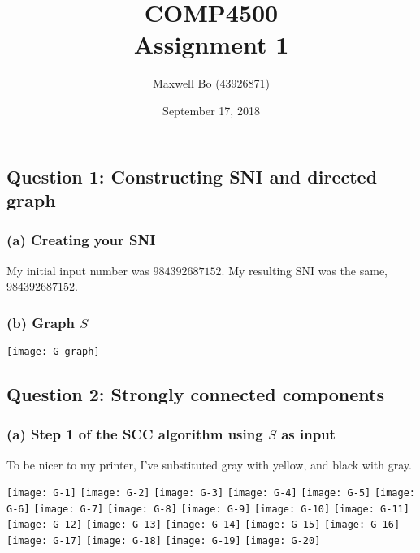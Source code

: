 \documentclass[11pt,a4paper]{article}
\begin{document}
\title{COMP4500 \\ Assignment 1}
\author{Maxwell Bo (43926871)}
\date{September 17, 2018}
\maketitle

\subsection*{Question 1: Constructing SNI and directed graph}
\subsubsection*{(a) Creating your SNI}

My initial input number was $984392687152$. My resulting SNI was the same, $984392687152$.

\subsubsection*{(b) Graph $S$}

\texttt{[image: G-graph]}
\newpage
\subsection*{Question 2: Strongly connected components}

\subsubsection*{(a) Step 1 of the SCC algorithm using $S$ as input}

To be nicer to my printer, I've substituted gray with yellow, and black with gray.

\texttt{[image: G-1]}
\texttt{[image: G-2]}
\texttt{[image: G-3]}
\texttt{[image: G-4]}
\texttt{[image: G-5]}
\texttt{[image: G-6]}
\texttt{[image: G-7]}
\texttt{[image: G-8]}
\texttt{[image: G-9]}
\texttt{[image: G-10]}
\texttt{[image: G-11]}
\texttt{[image: G-12]}
\texttt{[image: G-13]}
\texttt{[image: G-14]}
\texttt{[image: G-15]}
\texttt{[image: G-16]}
\texttt{[image: G-17]}
\texttt{[image: G-18]}
\texttt{[image: G-19]}
\texttt{[image: G-20]}
\end{document}
